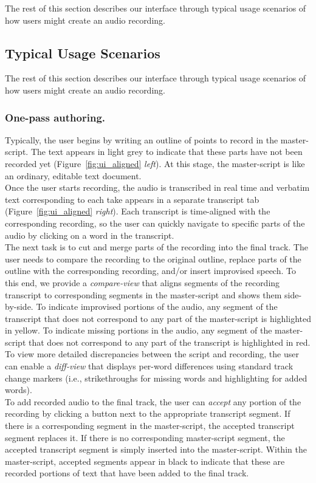 The rest of this section describes our interface through typical usage scenarios of how users might create an audio recording. 
%
\subsection{Typical Usage Scenarios}
The rest of this section describes our interface through typical usage scenarios of how users might create an audio recording. 

\subsubsection{One-pass authoring.} 
Typically, the user begins by writing an outline of points to record in the master-script.
The text appears in light grey to indicate that these parts have not been recorded yet (Figure~\ref{fig:ui_aligned} \textit{left}). At this stage, the master-script is like an ordinary, editable text document. \\

Once the user starts recording, the audio is transcribed in real time and verbatim text corresponding to each take appears in a separate transcript tab (Figure~\ref{fig:ui_aligned} \textit{right}). Each transcript is time-aligned with the corresponding recording, so the user can quickly navigate to specific
parts of the audio by clicking on a word in the transcript. \\

The next task is to cut and merge parts of the recording into the final track. The user needs to compare the recording to the original outline, replace parts of the outline with the corresponding recording, and/or insert improvised speech. To this end, we provide a \textit{compare-view} that aligns segments of the recording transcript to corresponding segments in the master-script and shows them side-by-side. To indicate improvised portions of the audio, any segment of the transcript that does not correspond to any part of the master-script is highlighted in yellow. To indicate missing portions in the audio, any segment of the master-script that does not correspond to any part of the transcript is highlighted in red. To
view more detailed discrepancies between the script and recording, the
user can enable a \textit{diff-view} that displays per-word differences
using standard track change markers (i.e., strikethroughs for
missing words and highlighting for added words). \\

To add recorded audio to the final track, the user can \textit{accept} any portion of the recording by clicking a button next to the appropriate transcript segment. If there is a corresponding segment in the master-script, the accepted transcript segment replaces it. If there is no corresponding master-script segment, the accepted transcript segment is simply inserted into the master-script. Within the master-script, accepted segments appear in black to indicate that these are recorded portions of text that have been added to the final track. \\

